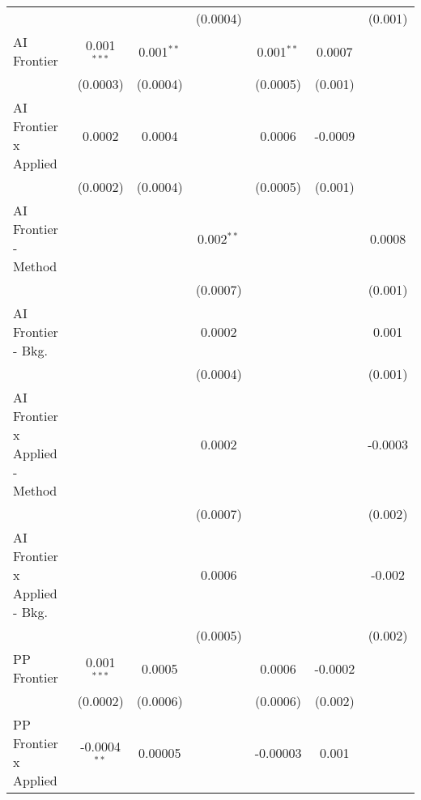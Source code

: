 \begin{tabular}{lcccccc}
                                  &                &               & (0.0004)      &                &                & (0.001)\\   
   AI Frontier                    & 0.001$^{***}$  & 0.001$^{**}$  &               & 0.001$^{**}$   & 0.0007         &   \\   
                                  & (0.0003)       & (0.0004)      &               & (0.0005)       & (0.001)        &   \\   
   AI Frontier x Applied          & 0.0002         & 0.0004        &               & 0.0006         & -0.0009        &   \\   
                                  & (0.0002)       & (0.0004)      &               & (0.0005)       & (0.001)        &   \\   
   AI Frontier - Method           &                &               & 0.002$^{**}$  &                &                & 0.0008\\   
                                  &                &               & (0.0007)      &                &                & (0.001)\\   
   AI Frontier - Bkg.             &                &               & 0.0002        &                &                & 0.001\\   
                                  &                &               & (0.0004)      &                &                & (0.001)\\   
   AI Frontier x Applied - Method &                &               & 0.0002        &                &                & -0.0003\\   
                                  &                &               & (0.0007)      &                &                & (0.002)\\   
   AI Frontier x Applied - Bkg.   &                &               & 0.0006        &                &                & -0.002\\   
                                  &                &               & (0.0005)      &                &                & (0.002)\\   
   PP Frontier                    & 0.001$^{***}$  & 0.0005        &               & 0.0006         & -0.0002        &   \\   
                                  & (0.0002)       & (0.0006)      &               & (0.0006)       & (0.002)        &   \\   
   PP Frontier x Applied          & -0.0004$^{**}$ & 0.00005       &               & -0.00003       & 0.001          &   \\   

\end{tabular}
